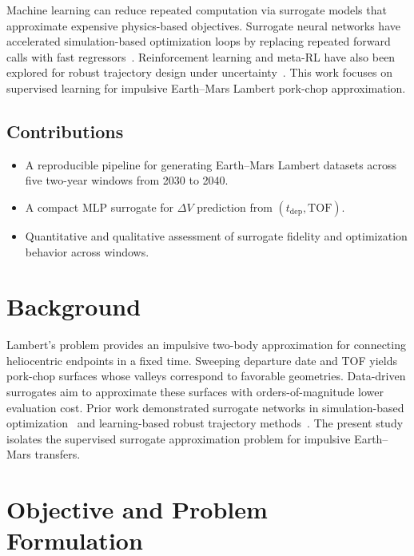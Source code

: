 \documentclass[conference]{IEEEtran}
\begin{document}
	Machine learning can reduce repeated computation via surrogate models that approximate expensive physics-based objectives. Surrogate neural networks have accelerated simulation-based optimization loops by replacing repeated forward calls with fast regressors~\cite{ruff2023}. Reinforcement learning and meta-RL have also been explored for robust trajectory design under uncertainty~\cite{zavoli2021,federici2024}. This work focuses on supervised learning for impulsive Earth--Mars Lambert pork-chop approximation.
	
	\subsection{Contributions}
	\begin{itemize}
		\item A reproducible pipeline for generating Earth--Mars Lambert datasets across five two-year windows from 2030 to 2040.
		\item A compact MLP surrogate for $\Delta V$ prediction from $(t_{\mathrm{dep}}, \mathrm{TOF})$.
		\item Quantitative and qualitative assessment of surrogate fidelity and optimization behavior across windows.
	\end{itemize}
	
	\section{Background}
	Lambert’s problem provides an impulsive two-body approximation for connecting heliocentric endpoints in a fixed time. Sweeping departure date and TOF yields pork-chop surfaces whose valleys correspond to favorable geometries. Data-driven surrogates aim to approximate these surfaces with orders-of-magnitude lower evaluation cost. Prior work demonstrated surrogate networks in simulation-based optimization~\cite{ruff2023} and learning-based robust trajectory methods~\cite{zavoli2021,federici2024}. The present study isolates the supervised surrogate approximation problem for impulsive Earth--Mars transfers.
	
	\section{Objective and Problem Formulation}
\end{document}
